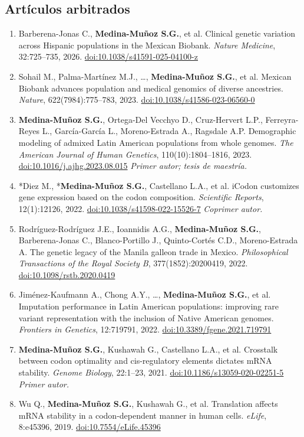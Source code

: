 \documentclass[11pt,letterpaper]{article}
\newcommand{\yo}{\textbf{Medina-Muñoz S.G.}}
\newcommand{\pub}[1]{\item #1}
\begin{document}
\subsection*{Artículos arbitrados}
\begin{enumerate}[label=\arabic*.,leftmargin=1.5em]
\pub{Barberena-Jonas C., \yo, et al. Clinical genetic variation across Hispanic populations in the Mexican Biobank. \textit{Nature Medicine}, 32:725--735, 2026. \href{https://doi.org/10.1038/s41591-025-04100-z}{doi:10.1038/s41591-025-04100-z}}
\pub{Sohail M., Palma-Martínez M.J., \ldots, \yo, et al. Mexican Biobank advances population and medical genomics of diverse ancestries. \textit{Nature}, 622(7984):775--783, 2023. \href{https://doi.org/10.1038/s41586-023-06560-0}{doi:10.1038/s41586-023-06560-0}}
\pub{\yo, Ortega-Del Vecchyo D., Cruz-Hervert L.P., Ferreyra-Reyes L., García-García L., Moreno-Estrada A., Ragsdale A.P. Demographic modeling of admixed Latin American populations from whole genomes. \textit{The American Journal of Human Genetics}, 110(10):1804--1816, 2023. \href{https://doi.org/10.1016/j.ajhg.2023.08.015}{doi:10.1016/j.ajhg.2023.08.015} \emph{Primer autor; tesis de maestría.}}
\pub{*Diez M., *\yo, Castellano L.A., et al. iCodon customizes gene expression based on the codon composition. \textit{Scientific Reports}, 12(1):12126, 2022. \href{https://doi.org/10.1038/s41598-022-15526-7}{doi:10.1038/s41598-022-15526-7} \emph{Coprimer autor.}}
\pub{Rodríguez-Rodríguez J.E., Ioannidis A.G., \yo, Barberena-Jonas C., Blanco-Portillo J., Quinto-Cortés C.D., Moreno-Estrada A. The genetic legacy of the Manila galleon trade in Mexico. \textit{Philosophical Transactions of the Royal Society B}, 377(1852):20200419, 2022. \href{https://doi.org/10.1098/rstb.2020.0419}{doi:10.1098/rstb.2020.0419}}
\pub{Jiménez-Kaufmann A., Chong A.Y., \ldots, \yo, et al. Imputation performance in Latin American populations: improving rare variant representation with the inclusion of Native American genomes. \textit{Frontiers in Genetics}, 12:719791, 2022. \href{https://doi.org/10.3389/fgene.2021.719791}{doi:10.3389/fgene.2021.719791}}
\pub{\yo, Kushawah G., Castellano L.A., et al. Crosstalk between codon optimality and cis-regulatory elements dictates mRNA stability. \textit{Genome Biology}, 22:1--23, 2021. \href{https://doi.org/10.1186/s13059-020-02251-5}{doi:10.1186/s13059-020-02251-5} \emph{Primer autor.}}
\pub{Wu Q., \yo, Kushawah G., et al. Translation affects mRNA stability in a codon-dependent manner in human cells. \textit{eLife}, 8:e45396, 2019. \href{https://doi.org/10.7554/eLife.45396}{doi:10.7554/eLife.45396}}
\end{enumerate}
\end{document}
